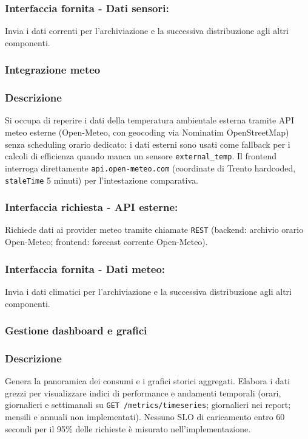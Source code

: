         \subsubsection*{Interfaccia fornita - Dati sensori:}
            Invia i dati correnti per l'archiviazione e la successiva distribuzione agli altri componenti.

    \subsubsection{Integrazione meteo}
        \subsubsection*{Descrizione}
            Si occupa di reperire i dati della temperatura ambientale esterna tramite API meteo esterne (Open-Meteo, con geocoding via Nominatim OpenStreetMap) senza scheduling orario dedicato: i dati esterni sono usati come fallback per i calcoli di efficienza quando manca un sensore \texttt{external\_temp}. Il frontend interroga direttamente \texttt{api.open-meteo.com} (coordinate di Trento hardcoded, \texttt{staleTime} 5 minuti) per l'intestazione comparativa.
        \subsubsection*{Interfaccia richiesta - API esterne:}
            Richiede dati ai provider meteo tramite chiamate \texttt{REST} (backend: archivio orario Open-Meteo; frontend: forecast corrente Open-Meteo).
        \subsubsection*{Interfaccia fornita - Dati meteo:}
            Invia i dati climatici per l'archiviazione e la successiva distribuzione agli altri componenti.

    \subsubsection{Gestione dashboard e grafici}
        \subsubsection*{Descrizione}
            Genera la panoramica dei consumi e i grafici storici aggregati. Elabora i dati grezzi per visualizzare indici di performance e andamenti temporali (orari, giornalieri e settimanali su \texttt{GET /metrics/timeseries}; giornalieri nei report; mensili e annuali non implementati). Nessuno SLO di caricamento entro 60 secondi per il 95\% delle richieste \`e misurato nell'implementazione.
